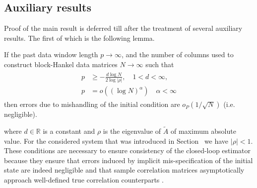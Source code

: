 \subsection{Auxiliary results}
Proof of the main result is deferred till after the treatment of several auxiliary results. The first of which is the following lemma.
\setcounter{thm}{0}
\begin{lem}\label{lem:relative_rates}\citep{Chiuso2006}
    If the past data window length $p\rightarrow\infty$, and the number of columns used to construct block-Hankel data matrices $N\rightarrow\infty$ such that%
    \begin{align}\label{eq:relative_rates}
        \begin{split}
            p &\geq -\frac{d\log N}{2\log|\rho|}, \quad 1 < d < \infty,\\
            p&=o((\log N)^\alpha) \quad \alpha < \infty%
        \end{split}
    \end{align}
    then errors due to mishandling of the initial condition are $o_P(1/\sqrt{N})$ (i.e. negligible).
\end{lem}
where $d\in\mathbb{R}$ is a constant and $\rho$ is the eigenvalue of $\tilde{A}$ of maximum absolute value. For the considered system that was introduced in Section~ we have $|\rho|<1$. These conditions are necessary to ensure consistency of the closed-loop estimator because they ensure that errors induced by implicit mis-specification of the initial state are indeed negligible and that sample correlation matrices asymptotically approach well-defined true correlation counterparts  \cite{Chiuso2007,Bauer2002}.

